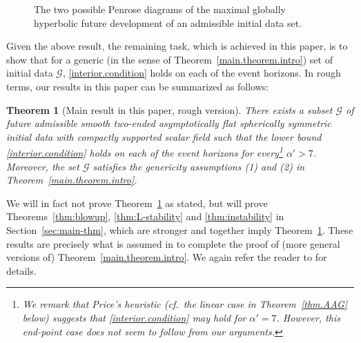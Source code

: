 \documentclass[10pt, reqno]{amsart}
\newtheorem{theorem}{Theorem}[section]
\theoremstyle{definition}
\theoremstyle{remark}
\theoremstyle{conjecture}
\numberwithin{equation}{section}
\newcommand{\0}{\emptyset}
\newcommand{\alp}{\alpha}
\begin{document}
\begin{figure}[h]
\begin{center}
\def\svgwidth{400px}
 
\caption{The two possible Penrose diagrams of the maximal globally hyperbolic future development of an admissible initial data set.} \label{fig:Kommemi.intro}
\end{center}
\end{figure}

Given the above result, the remaining task, which is achieved in this paper, is to show that for a generic (in the sense of Theorem~\ref{main.theorem.intro}) set of initial data $\mathcal G$, \eqref{interior.condition} holds on each of the event horizons. In rough terms, our results in this paper can be summarized as follows:
\begin{theorem}[Main result in this paper, rough version]\label{thm.main.thispaper.intro}
There exists a subset $\mathcal G$ of future admissible smooth two-ended asymptotically flat spherically symmetric initial data with compactly supported scalar field such that the lower bound \eqref{interior.condition} holds on each of the event horizons for every\footnote{We remark that Price's heuristic (cf.~the linear case in Theorem~\ref{thm.AAG} below) suggests that \eqref{interior.condition} may hold for $\alp'=7$. However, this end-point case does not seem to follow from our arguments.} $\alp'>7$. Moreover, the set $\mathcal G$ satisfies the genericity assumptions (1) and (2) in Theorem~\ref{main.theorem.intro}.
\end{theorem}

We will in fact not prove Theorem~\ref{thm.main.thispaper.intro} as stated, but will prove Theorems~\ref{thm:blowup}, \ref{thm:L-stability} and \ref{thm:instability} in Section~\ref{sec:main-thm}, which are stronger and together imply Theorem~\ref{thm.main.thispaper.intro}. These results are precisely what is assumed in \cite{LO.interior} to complete the proof of (more general versions of) Theorem~\ref{main.theorem.intro}. We again refer the reader to \cite{LO.interior} for details.
\end{document}
